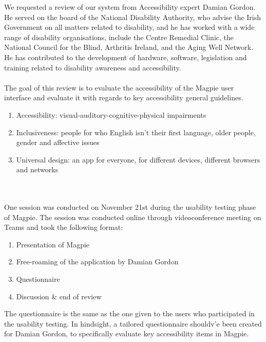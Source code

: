 We requested a review of our system from Accessibility expert Damian Gordon. He served on the board of the National Disability Authority, who advise the Irish Government on all matters related to disability, and he has worked with a wide range of disability organisations, include the Centre Remedial Clinic, the National Council for the Blind, Arthritis Ireland, and the Aging Well Network. He has contributed to the development of hardware, software, legislation and training related to disability awareness and accessibility.\\\\
The goal of this review is to evaluate the accessibility of the Magpie user interface and evaluate it with regards to key accessibility general guidelines.\\
\begin{enumerate}
    \item Accessibility: visual-auditory-cognitive-physical impairments
    \item Inclusiveness: people for who English isn't their first language, older people, gender and affective issues
    \item Universal design: an app for everyone, for different devices, different browsers and networks
\end{enumerate}
 \\ \\
One session was conducted on November 21st during the usability testing phase of Magpie. The session was conducted online through videoconference meeting on Teams and took the following format:
\begin{enumerate}
    \item Presentation of Magpie
    \item Free-roaming of the application by Damian Gordon
    \item Questionnaire
    \item Discussion \& end of review
\end{enumerate}
The questionnaire is the same as the one given to the users who participated in the usability testing. In hindsight, a tailored questionnaire shouldv'e been created for Damian Gordon, to specifically evaluate key accessibility items in Magpie.
